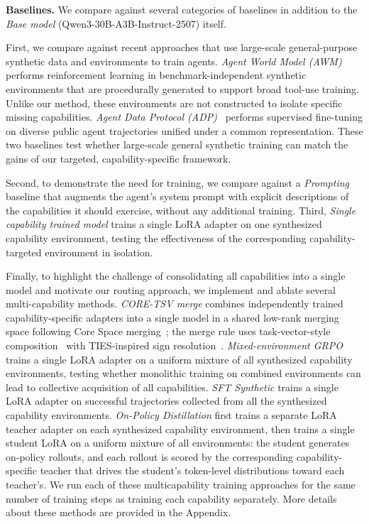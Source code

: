 \noindent\textbf{Baselines.}
We compare against several categories of baselines in addition to the \emph{Base model} (Qwen3-30B-A3B-Instruct-2507) itself. 

First, we compare against recent approaches that use large-scale general-purpose synthetic data and environments to train agents. \emph{Agent World Model (AWM)} performs reinforcement learning in benchmark-independent synthetic environments that are procedurally generated to support broad tool-use training. Unlike our method, these environments are not constructed to isolate specific missing capabilities. \emph{Agent Data Protocol (ADP)}~\citep{song2026agentdataprotocol} performs supervised fine-tuning on diverse public agent trajectories unified under a common representation. These two baselines test whether large-scale general synthetic training can match the gains of our targeted, capability-specific framework.

Second, to demonstrate the need for training, we compare against a \emph{Prompting} baseline that augments the agent's system prompt with explicit descriptions of the capabilities it should exercise, without any additional training. Third, \emph{Single capability trained model} trains a single LoRA adapter on one synthesized capability environment, testing the effectiveness of the corresponding capability-targeted environment in isolation.

Finally, to highlight the challenge of consolidating all capabilities into a single model and motivate our routing approach, we implement and ablate several multi-capability methods. \emph{CORE-TSV merge} combines independently trained capability-specific adapters into a single model in a shared low-rank merging space following Core Space merging~\citep{panariello2025corespace}; the merge rule uses task-vector-style composition~\citep{ilharco2023taskarithmetic} with TIES-inspired sign resolution~\citep{yadav2023tiesmerging}. \emph{Mixed-environment GRPO} trains a single LoRA adapter on a uniform mixture of all synthesized capability environments, testing whether monolithic training on combined environments can lead to collective acquisition of all capabilities. \emph{SFT Synthetic} trains a single LoRA adapter on successful trajectories collected from all the synthesized capability environments. \emph{On-Policy Distillation} first trains a separate LoRA teacher adapter on each synthesized capability environment, then trains a single student LoRA on a uniform mixture of all environments: the student generates on-policy rollouts, and each rollout is scored by the corresponding capability-specific teacher that drives the student's token-level distributions toward each teacher's. We run each of these multicapability training approaches for the same number of training steps as training each capability separately. More details about these methods are provided in the Appendix.




